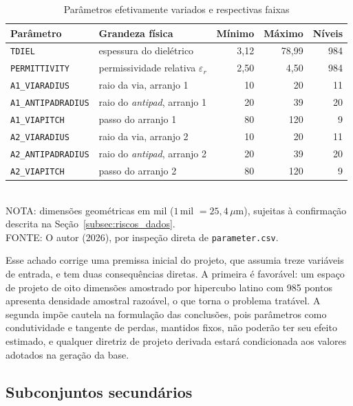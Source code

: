 \begin{table}[htb]
\centering
\caption{Parâmetros efetivamente variados e respectivas faixas}
\label{tab:features}
\footnotesize
\begin{tabular}{@{}llrrr@{}}
\toprule
\textbf{Parâmetro} & \textbf{Grandeza física} & \textbf{Mínimo} &
\textbf{Máximo} & \textbf{Níveis} \\
\midrule
\texttt{TDIEL} & espessura do dielétrico & 3{,}12 & 78{,}99 & 984 \\
\texttt{PERMITTIVITY} & permissividade relativa $\varepsilon_r$ & 2{,}50 &
4{,}50 & 984 \\
\texttt{A1\_VIARADIUS} & raio da via, arranjo 1 & 10 & 20 & 11 \\
\texttt{A1\_ANTIPADRADIUS} & raio do \textit{antipad}, arranjo 1 & 20 & 39 &
20 \\
\texttt{A1\_VIAPITCH} & passo do arranjo 1 & 80 & 120 & 9 \\
\texttt{A2\_VIARADIUS} & raio da via, arranjo 2 & 10 & 20 & 11 \\
\texttt{A2\_ANTIPADRADIUS} & raio do \textit{antipad}, arranjo 2 & 20 & 39 &
20 \\
\texttt{A2\_VIAPITCH} & passo do arranjo 2 & 80 & 120 & 9 \\
\bottomrule
\end{tabular}
\vspace{0.3em}
\\{\footnotesize NOTA: dimensões geométricas em mil ($1$\,mil $= 25{,}4\,\mu$m),
sujeitas à confirmação descrita na Seção~\ref{subsec:riscos_dados}.
\\FONTE: O autor (2026), por inspeção direta de \texttt{parameter.csv}.}
\end{table}

Esse achado corrige uma premissa inicial do projeto, que assumia treze variáveis
de entrada, e tem duas consequências diretas. A primeira é favorável: um espaço
de projeto de oito dimensões amostrado por hipercubo latino com 985 pontos
apresenta densidade amostral razoável, o que torna o problema tratável. A
segunda impõe cautela na formulação das conclusões, pois parâmetros como
condutividade e tangente de perdas, mantidos fixos, não poderão ter seu efeito
estimado, e qualquer diretriz de projeto derivada estará condicionada aos valores
adotados na geração da base.

\subsection{Subconjuntos secundários}

